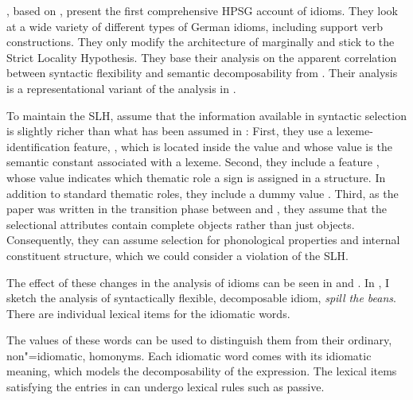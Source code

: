 \documentclass[output=paper]{langsci/langscibook}
\begin{document}
\cite{KE94a}, based on \cite{Erbach92a}, present the first comprehensive HPSG account of idioms. 
They look at a wide variety of different types of German idioms, including support verb constructions. 
They only modify the architecture of \cite{ps2} marginally and stick to the Strict Locality Hypothesis. 
They base their analysis on the apparent correlation between syntactic flexibility and semantic decomposability from \cite{WSN84a-u,NSW94a}. Their analysis is a representational variant of the analysis in \cite{GKPS85a}.

To maintain the SLH, \cite{KE94a} assume that the information available in syntactic selection is slightly richer than what has been assumed in \cite{ps2}:
First, they use a lexeme-identification feature, , which is located inside the  value and whose value is the semantic constant associated with a lexeme. 
Second, they include a feature , whose value indicates which thematic role a sign is assigned in a structure. In addition to standard thematic roles, they include a dummy value .
Third, as the paper was written in the transition phase between \cite{ps} and \cite{ps2}, they assume that the selectional attributes contain complete  objects rather than just  objects. 
Consequently, they can assume selection for phonological properties and internal constituent structure, which we could consider a violation of the SLH. 

The effect of these changes in the analysis of idioms can be seen in  and . In , I sketch the analysis of syntactically flexible, decomposable idiom, \emph{spill the beans}.
There are individual lexical items for the idiomatic words. 


\eal %
\label{ke-spill}
\ex 
{}
\ex 
{}
\zl 

The  values of these words can be used to distinguish them from their ordinary, non"=idiomatic, homonyms. 
Each idiomatic word comes with its idiomatic meaning, which models the decomposability of the expression. 
The lexical items satisfying the entries in  can undergo lexical rules such as passive. 
\end{document}

